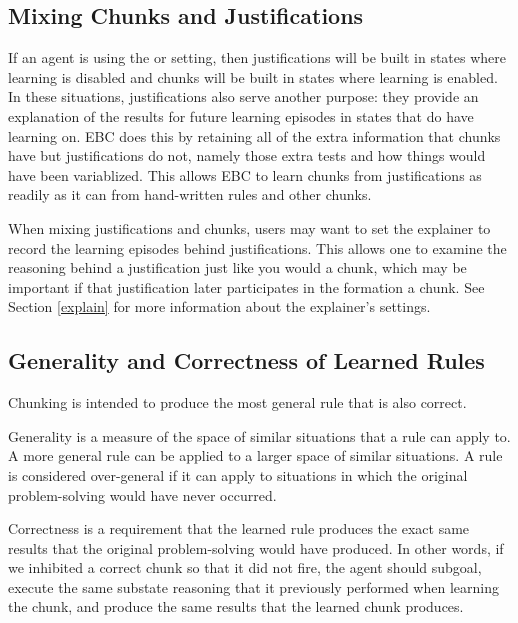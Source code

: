 \subsection{Mixing Chunks and Justifications}
\label{CHUNKING-subtleties-justifications}

If an agent is using the  or  setting, then justifications will be built in states where learning is disabled and chunks will be built in states where learning is enabled.  In these situations, justifications also serve another purpose:  they provide an explanation of the results for future learning episodes in states that do have learning on.  EBC does this by retaining all of the extra information that chunks have but justifications do not, namely those extra tests and how things would have been variablized.  This allows EBC to learn chunks from justifications as readily as it can from hand-written rules and other chunks.

When mixing justifications and chunks, users may want to set the explainer to record the learning episodes behind justifications.  This allows one to examine the reasoning behind a justification just like you would a chunk, which may be important if that justification later participates in the formation a chunk. See Section \ref{explain} for more information about the explainer's settings.

\subsection{Generality and Correctness of Learned Rules}
\label{CHUNKING-subtleties-correctness}

Chunking is intended to produce the most general rule that is also correct.

Generality is a measure of the space of similar situations that a rule can apply to.  A more general rule can be applied to a larger space of similar situations.  A rule is considered over-general if it can apply to situations in which the original problem-solving would have never occurred.

Correctness is a requirement that the learned rule produces the exact same results that the original problem-solving would have produced.  In other words, if we inhibited a correct chunk so that it did not fire, the agent should subgoal, execute the same substate reasoning that it previously performed when learning the chunk, and produce the same results that the learned chunk produces.

